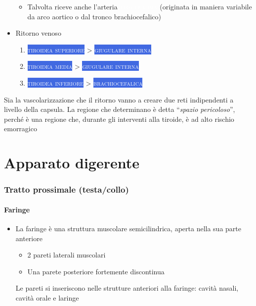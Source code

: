 \documentclass[italian,]{article}
\providecommand{\tightlist}{%
  \setlength{\itemsep}{0pt}\setlength{\parskip}{0pt}}
\newcommand{\ven}[1]{\colorbox{RoyalBlue}{\textcolor{white}{\textsc{#1}}}}
\newcommand{\art}[1]{\colorbox{RedOrange}{\textcolor{white}{\textsc{#1}}}}
\begin{document}
\begin{itemize}
  \begin{itemize}
  \tightlist
  \item
    Talvolta riceve anche l'arteria \art{tiroidea ima} (originata in
    maniera variabile da arco aortico o dal tronco brachiocefalico)
  \end{itemize}
\item
  Ritorno venoso

  \begin{enumerate}
  \def\labelenumi{\arabic{enumi}.}
  \tightlist
  \item
    \ven{tiroidea superiore} \textgreater{} \ven{giugulare interna}
  \item
    \ven{tiroidea media} \textgreater{} \ven{giugulare interna}
  \item
    \ven{tiroidea inferiore} \textgreater{} \ven{brachiocefalica}
  \end{enumerate}
\end{itemize}

\footnotesize

Sia la vascolarizzazione che il ritorno vanno a creare due reti
indipendenti a livello della capsula. La regione che determinano è detta
``\emph{spazio pericoloso}'', perché è una regione che, durante gli
interventi alla tiroide, è ad alto rischio emorragico \normalsize

\clearpage
\part{Apparato digerente}

\hypertarget{tratto-prossimale-testacollo}{%
\section{Tratto prossimale
(testa/collo)}\label{tratto-prossimale-testacollo}}

\hypertarget{faringe}{%
\subsection{Faringe}\label{faringe}}

\begin{itemize}
\tightlist
\item
  La faringe è una struttura muscolare semicilindrica, aperta nella sua
  parte anteriore

  \begin{itemize}
  \tightlist
  \item
    2 pareti laterali muscolari
  \item
    Una parete posteriore fortemente discontinua
  \end{itemize}

  Le pareti si inseriscono nelle strutture anteriori alla faringe:
  cavità nasali, cavità orale e laringe
\end{itemize}
\end{document}
